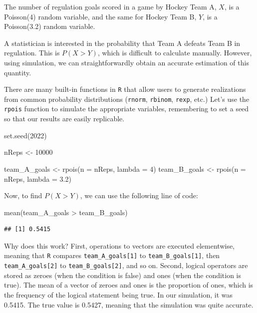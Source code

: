 \documentclass[
  11pt,
]{book}
\newenvironment{Shaded}{\begin{snugshade}}{\end{snugshade}}
\newcommand{\AttributeTok}[1]{\textcolor[rgb]{0.77,0.63,0.00}{#1}}
\newcommand{\DecValTok}[1]{\textcolor[rgb]{0.00,0.00,0.81}{#1}}
\newcommand{\FloatTok}[1]{\textcolor[rgb]{0.00,0.00,0.81}{#1}}
\newcommand{\FunctionTok}[1]{\textcolor[rgb]{0.00,0.00,0.00}{#1}}
\newcommand{\NormalTok}[1]{#1}
\newcommand{\OtherTok}[1]{\textcolor[rgb]{0.56,0.35,0.01}{#1}}
\newcommand{\SpecialCharTok}[1]{\textcolor[rgb]{0.00,0.00,0.00}{#1}}
\theoremstyle{definition}
\theoremstyle{definition}
\theoremstyle{definition}
\theoremstyle{definition}
\theoremstyle{remark}
\begin{document}
The number of regulation goals scored in a game by Hockey Team A, \(X\), is a Poisson(4) random variable, and the same for Hockey Team B, \(Y\), is a Poisson(3.2) random variable.

A statistician is interested in the probability that Team A defeats Team B in regulation. This is \(P(X > Y)\), which is difficult to calculate manually. However, using simulation, we can straightforwardly obtain an accurate estimation of this quantity.

There are many built-in functions in \texttt{R} that allow users to generate realizations from common probability distributions (\texttt{rnorm}, \texttt{rbinom}, \texttt{rexp}, etc.) Let's use the \texttt{rpois} function to simulate the appropriate variables, remembering to set a seed so that our results are easily replicable.

\begin{Shaded}
\begin{Highlighting}[]
\FunctionTok{set.seed}\NormalTok{(}\DecValTok{2022}\NormalTok{)}

\NormalTok{nReps }\OtherTok{\textless{}{-}} \DecValTok{10000}

\NormalTok{team\_A\_goals }\OtherTok{\textless{}{-}} \FunctionTok{rpois}\NormalTok{(}\AttributeTok{n =}\NormalTok{ nReps, }\AttributeTok{lambda =} \DecValTok{4}\NormalTok{)}
\NormalTok{team\_B\_goals }\OtherTok{\textless{}{-}} \FunctionTok{rpois}\NormalTok{(}\AttributeTok{n =}\NormalTok{ nReps, }\AttributeTok{lambda =} \FloatTok{3.2}\NormalTok{)}
\end{Highlighting}
\end{Shaded}

Now, to find \(P(X > Y)\), we can use the following line of code:

\begin{Shaded}
\begin{Highlighting}[]
\FunctionTok{mean}\NormalTok{(team\_A\_goals }\SpecialCharTok{\textgreater{}}\NormalTok{ team\_B\_goals)}
\end{Highlighting}
\end{Shaded}

\begin{verbatim}
## [1] 0.5415
\end{verbatim}

Why does this work? First, operations to vectors are executed elementwise, meaning that \texttt{R} compares \texttt{team\_A\_goals{[}1{]}} to \texttt{team\_B\_goals{[}1{]}}, then \texttt{team\_A\_goals{[}2{]}} to \texttt{team\_B\_goals{[}2{]}}, and so on. Second, logical operators are stored as zeroes (when the condition is false) and ones (when the condition is true). The mean of a vector of zeroes and ones is the proportion of ones, which is the frequency of the logical statement being true. In our simulation, it was 0.5415. The true value is 0.5427, meaning that the simulation was quite accurate.
\end{document}
